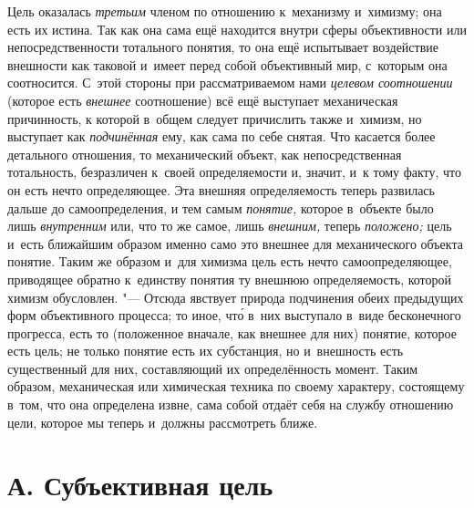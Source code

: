 Цель оказалась
{\em третьим} членом по
отношению к~механизму и~химизму; она есть их истина. Так как она сама ещё
находится внутри сферы объективности или непосредственности тотального
понятия, то она ещё испытывает воздействие внешности как таковой и~имеет
перед собой объективный мир, с~которым она соотносится. С~этой стороны при
рассматриваемом нами {\em целевом
соотношении} (которое есть
{\em внешнее}
соотношение) всё ещё выступает механическая причинность, к
которой в~общем следует причислить также и~химизм, но выступает как
{\em подчинённая} ему,
как сама по себе снятая. Что касается более детального отношения, то
механический объект, как непосредственная тотальность, безразличен к~своей
определяемости и, значит, и~к тому факту, что он есть нечто определяющее.
Эта внешняя определяемость теперь развилась дальше до самоопределения, и
тем самым {\em понятие,}
которое в~объекте было лишь
{\em внутренним} или, что
то же самое, лишь {\em внешним,}
теперь {\em положено;}
цель и~есть ближайшим образом именно само это внешнее для
механического объекта понятие. Таким же образом и~для химизма цель есть
нечто самоопределяющее, приводящее обратно к~единству понятия ту внешнюю
определяемость, которой химизм обусловлен. "--- Отсюда явствует
природа подчинения обеих предыдущих форм объективного процесса; то иное, чт\'{о}
 в~них выступало в~виде бесконечного прогресса, есть то (положенное
вначале, как внешнее для них) понятие, которое есть цель; не только понятие
есть их субстанция, но и~внешность есть существенный для них, составляющий
их определённость момент. Таким образом, механическая или
химическая техника по своему характеру, состоящему в~том, что она
определена извне, сама собой отдаёт себя на службу отношению цели, которое
мы теперь и~должны рассмотреть ближе.

\section[А. Субъективная цель]{А. Субъективная цель}


